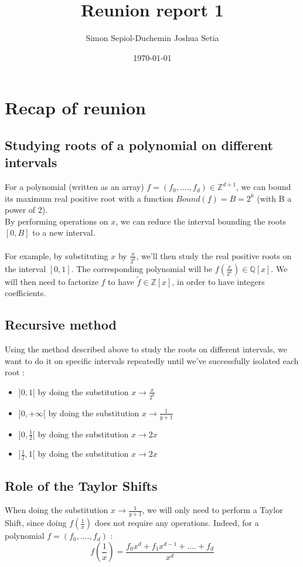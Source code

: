 \documentclass[a4paper,12pt]{article}
\title{Reunion report 1}
\author{Simon Sepiol-Duchemin Joshua Setia}
\date{\today}
\begin{document}
\maketitle

\section{Recap of reunion}

\subsection*{Studying roots of a polynomial on different intervals}

For a polynomial (written as an array) \( f = (f_0,....,f_d) \in \mathbb{Z}^{d+1} \), we can bound its maximum real positive root with a function \( Bound(\underline{f}) = B = 2^k\) (with B a power of 2).\\
By performing operations on \(x\), we can reduce the interval bounding the roots \([0,B]\) to a new interval.\\
\\
For example, by substituting \(x\) by \(\frac{x}{2^k}\), we'll then study the real positive roots on the interval \([0,1]\).
The corresponding polynomial will be \(f(\frac{x}{2^k}) \in \mathbb{Q}[x]\). We will then need to factorize \(f\) to have \(\tilde{f} \in \mathbb{Z}[x]\), in order to have integers coefficients.

\subsection*{Recursive method}
Using the method described above to study the roots on different intervals, we want to do it on specific intervals repeatedly until we've successfully isolated each root :
\begin{itemize}
  \item \(]0,1[\) by doing the substitution \(x \rightarrow \frac{x}{2^k}\)
  \item \(]0,+\infty[\) by doing the substitution \(x \rightarrow \frac{1}{y+1}\)
  \item \(]0,\frac{1}{2}[\) by doing the substitution \(x \rightarrow 2x\)
  \item \(]\frac{1}{2},1[\) by doing the substitution \(x \rightarrow 2x\)
\end{itemize}

\subsection*{Role of the Taylor Shifts}
When doing the substitution \(x \rightarrow \frac{1}{y+1}\), we will only need to perform a Taylor Shift, since doing \(f(\frac{1}{x})\) does not require any operations. Indeed, for a polynomial \(f = (f_0,....,f_d)\) :
\[
  f(\frac{1}{x}) = \frac{f_0x^d + f_1x^{d-1} + .... + f_d}{x^d}
\]
\end{document}
